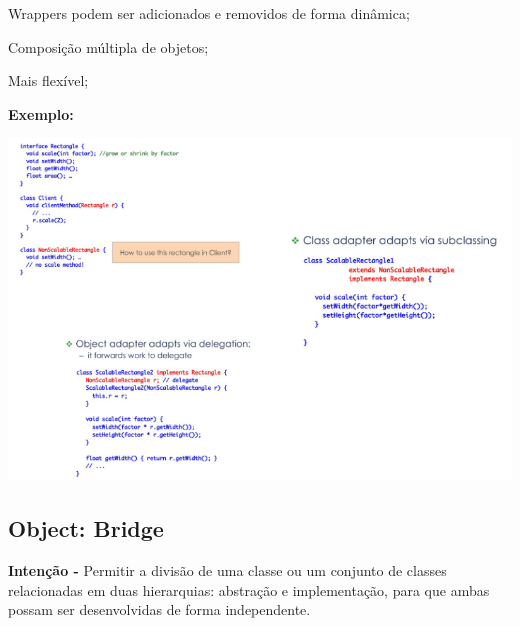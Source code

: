 \documentclass{article}
\begin{document}
Wrappers podem ser adicionados e removidos de forma dinâmica;

Composição múltipla de objetos;

Mais flexível;

\vspace{3mm}
\begin{flushleft}
    \textbf{Exemplo:}

    \includegraphics[scale=0.5]{Images/41.png}
\end{flushleft}

\pagebreak

\subsection{Object: Bridge}

\begin{flushleft}
    \textbf{Intenção -} Permitir a divisão de uma classe ou um conjunto de classes relacionadas em duas
    hierarquias: abstração e implementação, para que ambas possam ser desenvolvidas
    de forma independente.
\end{flushleft}
\end{document}
